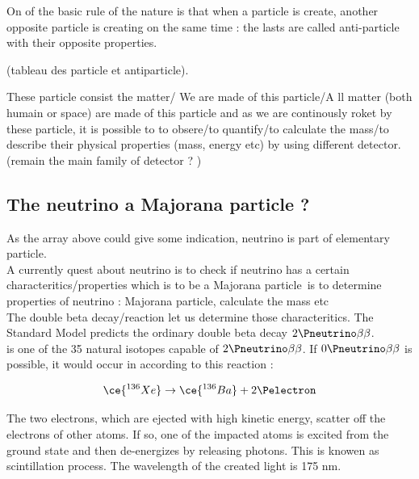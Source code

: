 \documentclass[a4paper, 11pt]{report}%
\begin{document}
  On of the basic rule of the nature  is that when a particle is create, another opposite particle is creating on the same time : the lasts are 
  called anti-particle with their opposite properties. 
  
  (tableau des particle et antiparticle). 
  
  These particle consist the matter/ We are made of this particle/A ll matter (both humain or space) are made of this particle and as we are 
  continously roket by these particle, it is possible to to obsere/to quantify/to calculate the mass/to describe their physical properties 
  (mass, energy etc) by using different detector. (remain the main family of detector ? )
  \\
  
  \subsection{The neutrino a Majorana particle ?}
  
  As the array above could give some indication, neutrino is part of elementary particle.\\
  A currently quest about neutrino is to check if neutrino has a certain characteritics/properties which is to be a Majorana particle\ is 
  to determine properties of neutrino : Majorana particle, calculate the mass etc\\
  The double beta decay/reaction let us determine those characteritics. The Standard Model 
  predicts the ordinary double beta decay \(2\Pneutrino\beta\beta\). 
  \\
  
   is one of the 35 natural isotopes capable of \(2\Pneutrino\beta\beta\). If \(0\Pneutrino\beta\beta\) is possible, 
  it would occur in  according to this reaction : 
    
  \begin{equation}
    \ce{^{136}Xe} \rightarrow \ce{^{136}Ba} + 2\Pelectron %
  \end{equation}
   
  The two electrons, which are ejected with high kinetic energy, scatter off the electrons of other  atoms. If so, one 
  of the impacted  atoms is excited from the ground state and then de-energizes by releasing photons. 
  This is knowen as scintillation process. The wavelength of the created light is 175 nm. 
  \\
  
\end{document}
